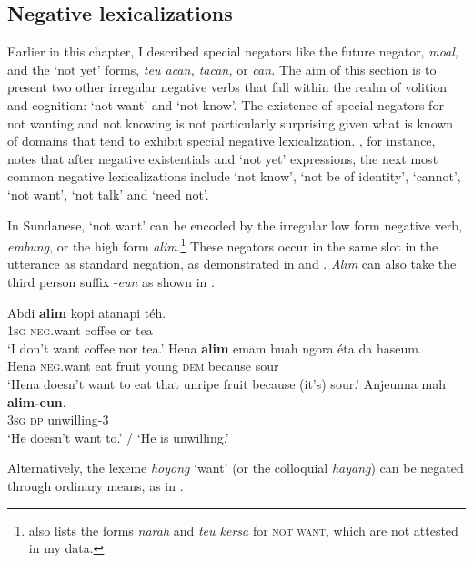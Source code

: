 \documentclass[output=paper]{langscibook}
\begin{document}
\subsection{Negative lexicalizations}\label{sec:sun:2.5}

Earlier in this chapter, I described special negators like the future negator, \textit{moal,} and the ‘{not yet}’ forms, \textit{teu acan, tacan,} or \textit{can.} The aim of this section is to present two other irregular negative verbs that fall within the realm of volition and cognition: ‘{not want}’ and ‘{not know}’. The existence of special negators for not wanting and not knowing is not particularly surprising given what is known of domains that tend to exhibit special negative lexicalization. \citet{Veselinova2013lexicalization}, for instance, notes that after negative existentials and ‘not yet’ expressions, the next most common negative lexicalizations include ‘not know’, ‘not be of identity’, ‘cannot’, ‘not want’, ‘not talk’ and ‘need not’.

In Sundanese, ‘{not want}’ can be encoded by the irregular low form negative verb, \textit{embung}, or the high form \textit{alim}.\footnote{\citet[219]{Hardjadibrata2003} also lists the forms \textit{narah} and \textit{teu kersa} for \textsc{not want}, which are not attested in my data.} These negators occur in the same slot in the utterance as standard negation, as demonstrated in  and . \textit{Alim} can also take the third person suffix -\textit{eun} as shown in . 

 \ea\label{ex:sun:28}
    \ea\label{ex:sun:28a}
        \gll  Abdi \textbf{alim} kopi atanapi téh. \\ 
              1\textsc{sg} \textsc{neg}.want coffee or tea\\
        \glt ‘I don’t want coffee nor tea.’
    \ex\label{ex:sun:28b}
        \gll  Hena \textbf{alim} emam buah ngora éta da haseum.\\
              Hena \textsc{neg}.want eat fruit young \textsc{dem} because sour\\
        \glt ‘Hena doesn’t want to eat that unripe fruit because (it’s) sour.’
    \ex\label{ex:sun:28c}
        \gll  Anjeunna mah \textbf{alim-eun}. \\
              3\textsc{sg} \textsc{dp} unwilling-3 \\
        \glt ‘He doesn’t want to.’ / ‘He is unwilling.’ \citep[73]{Butters2021}
    \z
\z 

 Alternatively, the lexeme \textit{hoyong} ‘want’ (or the colloquial \textit{hayang}) can be negated through ordinary means, as in . 
\end{document}
